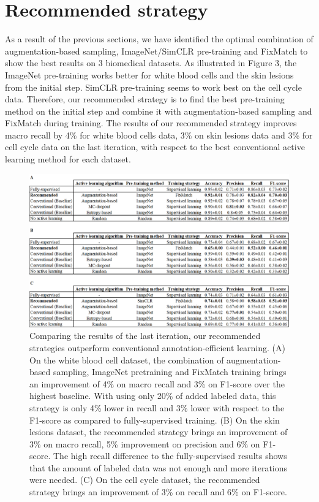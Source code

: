 \section{Recommended strategy}
As a result of the previous sections, we have identified the optimal combination of augmentation-based sampling, ImageNet/SimCLR pre-training and FixMatch to show the best results on 3 biomedical datasets. As illustrated in Figure 3, the ImageNet pre-training works better for white blood cells and the skin lesions from the initial step. SimCLR pre-training seems to work best on the cell cycle data. Therefore, our recommended strategy is to find the best pre-training method on the initial step and combine it with augmentation-based sampling and FixMatch during training. The results of our recommended strategy improves macro recall by 4\% for white blood cells data, 3\% on skin lesions data and 3\% for cell cycle data on the last iteration, with respect to the best conventional active learning method for each dataset.

\begin{figure}[htbp]
\centering
\captionsetup{format=plain}
\includegraphics[width=\textwidth]{figures/fig_results_3.png}
\caption{Comparing the results of the last iteration, our recommended strategies outperform conventional annotation-efficient learning. (A) On the white blood cell dataset, the combination of augmentation-based sampling, ImageNet pretraining and FixMatch training brings an improvement of 4\% on macro recall and 3\% on F1-score over the highest baseline. With using only 20\% of added labeled data, this strategy is only 4\% lower in recall and 3\% lower with respect to the F1-score as compared to fully-supervised training. (B) On the skin lesions dataset, the recommended strategy brings an improvement of 3\% on macro recall, 5\% improvement on precision and 6\% on F1-score. The high recall difference to the fully-supervised results shows that the amount of labeled data was not enough and more iterations were needed. (C) On the cell cycle dataset, the recommended strategy brings an improvement of 3\% on recall and 6\% on F1-score.
}
\label{fig:results_3}
\end{figure}